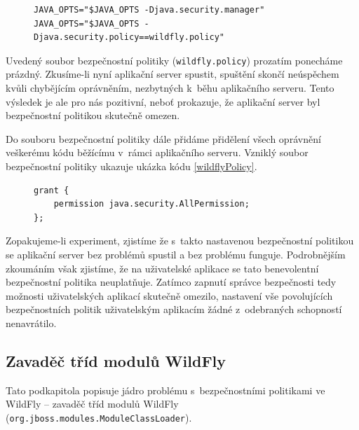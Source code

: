 \begin{figure}[tbh]
\begin{lstlisting}[caption=Doplnění spouštěcího skriptu o~použití správce bezpečnosti, label=wildflySeSMcode]
JAVA_OPTS="$JAVA_OPTS -Djava.security.manager"
JAVA_OPTS="$JAVA_OPTS -Djava.security.policy==wildfly.policy"
\end{lstlisting}
\end{figure}

Uvedený soubor bezpečnostní politiky ({\tt wildfly.policy}) prozatím ponecháme prázdný.
Zkusíme-li nyní aplikační server spustit, spuštění skončí neúspěchem kvůli chybějícím oprávněním, nezbytných k~běhu aplikačního serveru. Tento výsledek je ale pro nás pozitivní, neboť prokazuje, že aplikační server byl bezpečnostní politikou skutečně omezen.

Do souboru bezpečnostní politiky dále přidáme přidělení všech oprávnění veškerému kódu běžícímu v~rámci aplikačního serveru. Vzniklý soubor bezpečnostní politiky ukazuje ukázka kódu \ref{wildflyPolicy}.

\begin{figure}[tbh]
\begin{lstlisting}[caption=První testovací soubor bezpečnostní politiky, label=wildflyPolicy]
grant {
    permission java.security.AllPermission;
};
\end{lstlisting}
\end{figure}

Zopakujeme-li experiment, zjistíme že s~takto nastavenou bezpečnostní politikou se aplikační server bez problémů spustil a bez problému funguje.
Podrobnějším zkoumáním však zjistíme, že na uživatelské aplikace se tato benevolentní bezpečnostní politika neuplatňuje.
Zatímco zapnutí správce bezpečnosti tedy možnosti uživatelských aplikací skutečně omezilo, nastavení vše povolujících bezpečnostních politik uživatelským
aplikacím žádné z~odebraných schopností nenavrátilo.

\subsection{Zavaděč tříd modulů WildFly} \label{moduleClassLoader}

Tato podkapitola popisuje jádro problému s~bezpečnostními politikami ve WildFly -- zavaděč tříd modulů WildFly ({\tt org.jboss.modules.ModuleClassLoader}).

